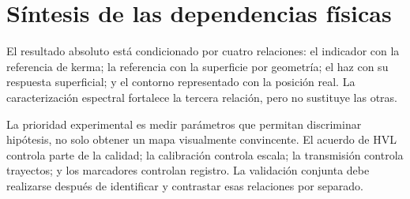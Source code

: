 \section{Síntesis de las dependencias físicas}
El resultado absoluto está condicionado por cuatro relaciones: el indicador con la referencia de kerma; la referencia con la superficie por geometría; el haz con su respuesta superficial; y el contorno representado con la posición real. La caracterización espectral fortalece la tercera relación, pero no sustituye las otras.

La prioridad experimental es medir parámetros que permitan discriminar hipótesis, no solo obtener un mapa visualmente convincente. El acuerdo de HVL controla parte de la calidad; la calibración controla escala; la transmisión controla trayectos; y los marcadores controlan registro. La validación conjunta debe realizarse después de identificar y contrastar esas relaciones por separado.
\FloatBarrier

